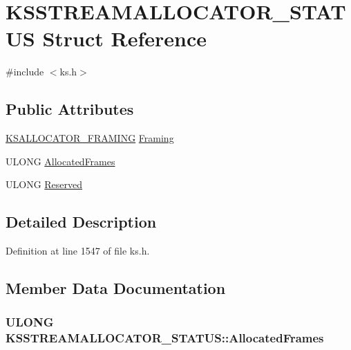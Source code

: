 \hypertarget{struct_k_s_s_t_r_e_a_m_a_l_l_o_c_a_t_o_r___s_t_a_t_u_s}{}\section{K\+S\+S\+T\+R\+E\+A\+M\+A\+L\+L\+O\+C\+A\+T\+O\+R\+\_\+\+S\+T\+A\+T\+US Struct Reference}
\label{struct_k_s_s_t_r_e_a_m_a_l_l_o_c_a_t_o_r___s_t_a_t_u_s}


{\ttfamily \#include $<$ks.\+h$>$}

\subsection*{Public Attributes}
\begin{DoxyCompactItemize}
\item 
\hyperlink{struct_k_s_a_l_l_o_c_a_t_o_r___f_r_a_m_i_n_g}{K\+S\+A\+L\+L\+O\+C\+A\+T\+O\+R\+\_\+\+F\+R\+A\+M\+I\+NG} \hyperlink{struct_k_s_s_t_r_e_a_m_a_l_l_o_c_a_t_o_r___s_t_a_t_u_s_aec69a994d32bf64ab192e00ad824ab0b}{Framing}
\item 
U\+L\+O\+NG \hyperlink{struct_k_s_s_t_r_e_a_m_a_l_l_o_c_a_t_o_r___s_t_a_t_u_s_a25dfbac1e77a72a8d630ad57ac0bc673}{Allocated\+Frames}
\item 
U\+L\+O\+NG \hyperlink{struct_k_s_s_t_r_e_a_m_a_l_l_o_c_a_t_o_r___s_t_a_t_u_s_a808a603d84c6a9df1778fffd3c7478f2}{Reserved}
\end{DoxyCompactItemize}


\subsection{Detailed Description}


Definition at line 1547 of file ks.\+h.



\subsection{Member Data Documentation}
\subsubsection[{\texorpdfstring{Allocated\+Frames}{AllocatedFrames}}]{\setlength{\rightskip}{0pt plus 5cm}U\+L\+O\+NG K\+S\+S\+T\+R\+E\+A\+M\+A\+L\+L\+O\+C\+A\+T\+O\+R\+\_\+\+S\+T\+A\+T\+U\+S\+::\+Allocated\+Frames}\hypertarget{struct_k_s_s_t_r_e_a_m_a_l_l_o_c_a_t_o_r___s_t_a_t_u_s_a25dfbac1e77a72a8d630ad57ac0bc673}{}\label{struct_k_s_s_t_r_e_a_m_a_l_l_o_c_a_t_o_r___s_t_a_t_u_s_a25dfbac1e77a72a8d630ad57ac0bc673}


